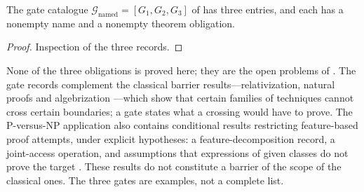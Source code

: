 

\begin{theorem}\label{cat:named-functorial-gates}
The gate catalogue \(\mathcal G_{\mathrm{named}}=[G_{1},G_{2},G_{3}]\)
of  has three entries, and each has a
nonempty name and a nonempty theorem obligation.
\end{theorem}

\begin{proof}
Inspection of the three records.
\end{proof}

None of the three obligations is proved here; they are the open
problems of .  The gate records
complement the classical barrier results---relativization, natural
proofs and algebrization
\cite{BakerGillSolovay1975Relativization,RazborovRudich1997NaturalProofs,AaronsonWigderson2009Algebrization}---which
show that certain families of techniques cannot cross certain
boundaries; a gate states what a crossing would have to prove.  The
P-versus-NP application also contains conditional results restricting
feature-based proof attempts, under explicit hypotheses: a
feature-decomposition record, a joint-access operation, and assumptions
that expressions of given classes do not prove the target
\cite{Tsiokos2026PvNP}.  These results do not constitute a barrier of
the scope of the classical ones.  The three gates are examples, not a complete list.
